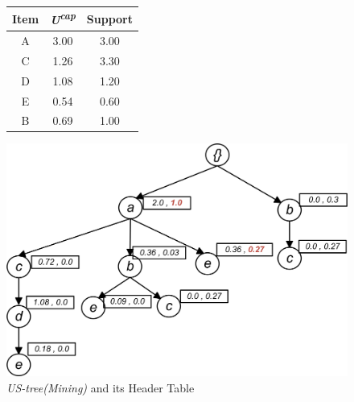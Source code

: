 \begin{figure}

\begin{minipage}{0.40\textwidth}
  \centering
  
	\begin{center}
	\begin{tabular}{ |c|c|c| } 
 	\hline
 		Item&\emph{U\textsuperscript{cap}}&Support\\ \hline\hline
 		A &  3.00  & 3.00	\\ \hline
 		C &  1.26  & 3.30	\\ \hline
 		D &  1.08  & 1.20	\\ \hline
 		E &  0.54  & 0.60	\\ \hline
 		B &  0.69  & 1.00	\\ \hline
\end{tabular}
\end{center}  
  
  
\end{minipage}
\hfill
\begin{minipage}{0.40\textwidth}
  \centering
  \includegraphics[width=\textwidth]{../images/sim_06.jpg}
\end{minipage}
\caption{\emph{US-tree(Mining)} and its Header Table}
\end{figure}
%
